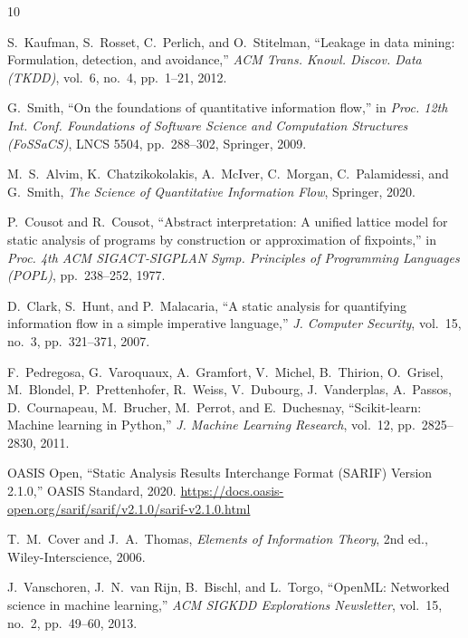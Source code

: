 \documentclass[11pt]{article}
\begin{document}
\begin{thebibliography}{10}

S.~Kaufman, S.~Rosset, C.~Perlich, and O.~Stitelman,
``Leakage in data mining: Formulation, detection, and avoidance,''
\emph{ACM Trans. Knowl. Discov. Data (TKDD)}, vol.~6, no.~4,
pp.~1--21, 2012.

G.~Smith,
``On the foundations of quantitative information flow,''
in \emph{Proc. 12th Int. Conf. Foundations of Software Science and Computation Structures (FoSSaCS)},
LNCS 5504, pp.~288--302, Springer, 2009.

M.~S.~Alvim, K.~Chatzikokolakis, A.~McIver, C.~Morgan,
C.~Palamidessi, and G.~Smith,
\emph{The Science of Quantitative Information Flow},
Springer, 2020.

P.~Cousot and R.~Cousot,
``Abstract interpretation: A unified lattice model for static analysis
of programs by construction or approximation of fixpoints,''
in \emph{Proc. 4th ACM SIGACT-SIGPLAN Symp. Principles of Programming Languages (POPL)},
pp.~238--252, 1977.

D.~Clark, S.~Hunt, and P.~Malacaria,
``A static analysis for quantifying information flow in a simple
imperative language,''
\emph{J. Computer Security}, vol.~15, no.~3, pp.~321--371, 2007.

F.~Pedregosa, G.~Varoquaux, A.~Gramfort, V.~Michel, B.~Thirion,
O.~Grisel, M.~Blondel, P.~Prettenhofer, R.~Weiss, V.~Dubourg,
J.~Vanderplas, A.~Passos, D.~Cournapeau, M.~Brucher, M.~Perrot,
and E.~Duchesnay,
``Scikit-learn: Machine learning in {P}ython,''
\emph{J. Machine Learning Research}, vol.~12, pp.~2825--2830, 2011.

{OASIS Open},
``Static Analysis Results Interchange Format (SARIF) Version 2.1.0,''
OASIS Standard, 2020.
\url{https://docs.oasis-open.org/sarif/sarif/v2.1.0/sarif-v2.1.0.html}

T.~M.~Cover and J.~A.~Thomas,
\emph{Elements of Information Theory}, 2nd ed.,
Wiley-Interscience, 2006.

J.~Vanschoren, J.~N.~van Rijn, B.~Bischl, and L.~Torgo,
``{OpenML}: Networked science in machine learning,''
\emph{ACM SIGKDD Explorations Newsletter}, vol.~15, no.~2,
pp.~49--60, 2013.


\end{thebibliography}
\end{document}
